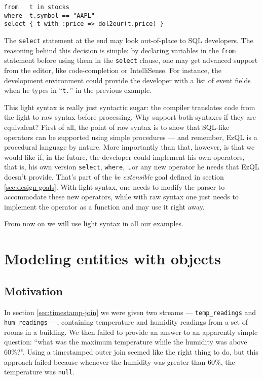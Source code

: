 \documentclass{report}
\begin{document}
\begin{verbatim}
from   t in stocks
where  t.symbol == "AAPL"
select { t with :price => dol2eur(t.price) }
\end{verbatim}

The \verb=select= statement at the end may look out-of-place to SQL
developers. The reasoning behind this decision is simple: by declaring
variables in the \verb=from= statement before using them in the
\verb=select= clause, one may get advanced support from the editor,
like code-completion or IntelliSense. For instance, the development
environment could provide the developer with a list of event fields
when he types in ``\verb=t.='' in the previous example.

This light syntax is really just syntactic sugar: the compiler
translates code from the light to raw syntax before processing. Why
support both syntaxes if they are equivalent? First of all, the point
of raw syntax is to show that SQL-like operators can be supported
using simple procedures --- and remember, EzQL is a procedural
language by nature. More importantly than that, however, is that we
would like if, in the future, the developer could implement his own
operators, that is, his own version \verb=select=, \verb=where=,
\ldots or any new operator he needs that EzQL doesn't provide. That's
part of the \emph{be extensible} goal defined in section
\ref{sec:design-goals}. With light syntax, one needs to modify the
parser to accommodate these new operators, while with raw syntax one
just needs to implement the operator as a function and may use it
right away.

From now on we will use light syntax in all our examples.

\chapter{Modeling entities with objects}
\label{chap:objects}

\section{Motivation}

In section \ref{sec:timestamp-join} we were given two streams ---
\verb=temp_readings= and \verb=hum_readings= ---, containing
temperature and humidity readings from a set of rooms in a
building. We then failed to provide an answer to an apparently simple
question: ``what was the maximum temperature while the humidity was
above 60\%?''. Using a timestamped outer join seemed like the right
thing to do, but this approach failed because whenever the humidity
was greater than 60\%, the temperature was \verb=null=.
\end{document}
